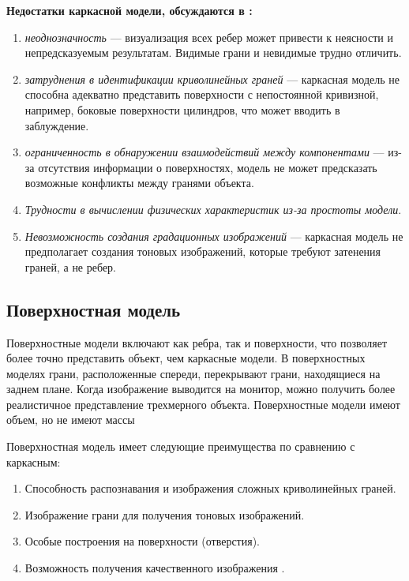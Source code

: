 \textbf{Недостатки каркасной модели, обсуждаются в \cite{model_geom_01}:}
\begin{enumerate}
      \item \textit{неоднозначность} --- визуализация всех ребер может привести к неясности и непредсказуемым результатам. Видимые грани и невидимые трудно отличить.
      \item \textit{затруднения в идентификации криволинейных граней} --- каркасная модель не способна адекватно представить поверхности с непостоянной кривизной, например, боковые поверхности цилиндров, что может вводить в заблуждение.
      \item \textit{ограниченность в обнаружении взаимодействий между компонентами} --- из-за отсутствия информации о поверхностях, модель не может предсказать возможные конфликты между гранями объекта. 
    		
    \item \textit{Трудности в вычислении физических характеристик из-за простоты модели}.
   	\item \textit{Невозможность создания градационных изображений} --- каркасная модель не предполагает создания тоновых изображений, которые требуют затенения граней, а не ребер.
\end{enumerate}
   
\clearpage
   

\subsection{Поверхностная модель}

Поверхностные модели включают как ребра, так и поверхности, что позволяет более точно представить объект, чем каркасные модели. В поверхностных моделях грани, расположенные спереди, перекрывают грани, находящиеся на заднем плане. Когда изображение выводится на монитор, можно получить более реалистичное представление трехмерного объекта. Поверхностные модели имеют объем, но не имеют массы \cite{model_geom}

Поверхностная модель имеет следующие преимущества по сравнению с каркасным:
\begin{enumerate}
\item Способность распознавания и изображения сложных криволинейных граней.
\item Изображение грани для получения тоновых изображений.
\item Особые построения на поверхности (отверстия).
\item Возможность получения качественного изображения \cite{model_geom_01}.
\end{enumerate}


